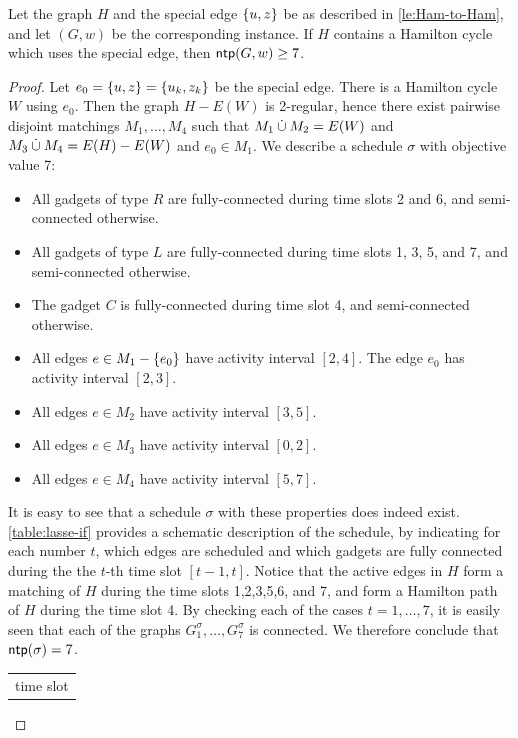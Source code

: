 \begin{lemma}
\label{lemma:lasse-if}
Let the graph $H$ and the special edge $\{ u,z \}$ be as described in \cref{le:Ham-to-Ham}, and let $(G, w)$ be the corresponding {\xxxNTP} instance. 
If $H$ contains a Hamilton cycle which uses the special edge, then $\operatorname{\textsf{ntp}}(G, w) \geq 7$.
\end{lemma}
\begin{proof}
Let $e_0 = \{ u, z \} = \{ u_k, z_k \}$ be the special edge. There is a Hamilton cycle $W$ using $e_0$. Then the graph $H-E(W)$ is 2-regular, hence there exist pairwise disjoint matchings $M_1, \ldots, M_4$ such that $M_1 \mathbin{\dot{\cup}} M_2 = E(W)$ and $M_3 \mathbin{\dot{\cup}} M_4 = E(H) - E(W)$ and $e_0 \in M_1$. We describe a schedule $\sigma$ with objective value 7:
\begin{itemize}
\item All gadgets of type $R$ are fully-connected during time slots 2 and 6, and semi-connected otherwise.
\item All gadgets of type $L$ are fully-connected during time slots 1, 3, 5, and 7, and semi-connected otherwise.
\item The gadget $C$ is fully-connected during time slot 4, and semi-connected otherwise.
\item All edges $e \in M_1 - \{ e_0 \}$ have activity interval $[2, 4]$. The edge $e_0$ has activity interval $[2, 3]$.
\item All edges $e \in M_2$ have activity interval $[3, 5]$.
\item All edges $e \in M_3$ have activity interval $[0, 2]$.
\item All edges $e \in M_4$ have activity interval $[5, 7]$.
\end{itemize}
It is easy to see that a schedule $\sigma$ with these properties does indeed exist. \cref{table:lasse-if} provides a schematic description of the schedule, by indicating for each number $t$, which edges are scheduled and which gadgets are fully connected during the the $t$-th time slot $[t-1, t]$.  Notice that the active edges in $H$ form a matching of $H$ during the time slots 1,2,3,5,6, and 7, 
and form a Hamilton path of $H$ during the time slot 4. 
By checking each of the cases $t=1,\dots,7$, it is easily seen that each of the graphs $G^\sigma_1,\ldots,G^\sigma_7$ is connected. We therefore conclude that $\operatorname{\textsf{ntp}}(\sigma) = 7$. 
\begin{table}[htpb]
\centering
 \begin{tabular}{ c | c | c | c | c | c | c } 
 \multicolumn{7}{c}{time slot}\\

\end{tabular}
\end{table}
\end{proof}
